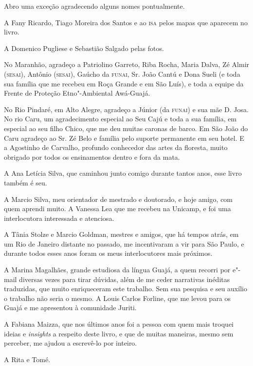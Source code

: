 Abro uma exceção agradecendo alguns nomes pontualmente.

A Fany Ricardo, Tiago Moreira dos Santos e ao \textsc{isa} pelos mapas que
aparecem no livro.

A Domenico Pugliese e Sebastião Salgado pelas fotos.

No Maranhão, agradeço a Patriolino Garreto, Riba Rocha, Maria Dalva, Zé
Almir (\textsc{sesai}), Antônio (\textsc{sesai}), Gaúcho da \textsc{funai}, Sr. João Cantú e Dona
Sueli (e toda sua família que me recebeu em Roça Grande e em São Luís),
e toda a equipe da Frente de Proteção Etno"-Ambiental Awá-Guajá.

No Rio Pindaré, em Alto Alegre, agradeço a Júnior (da \textsc{funai}) e sua mãe
D. Josa. No rio Caru, um agradecimento especial ao Seu Cajú e toda a sua
família, em especial ao seu filho Chico, que me deu muitas caronas de
barco. Em São João do Caru agradeço ao Sr. Zé Belo e família pelo
suporte permanente em seu hotel. E a Agostinho de Carvalho, profundo
conhecedor das artes da floresta, muito obrigado por todos os
ensinamentos dentro e fora da mata.

A Ana Letícia Silva, que caminhou junto comigo durante tantos anos, esse
livro também é seu.

A Marcio Silva, meu orientador de mestrado e doutorado, e hoje amigo,
com quem aprendi muito. A Vanessa Lea que me recebeu na Unicamp, e foi
uma interlocutora interessada e atenciosa.

A Tânia Stolze e Marcio Goldman, mestres e amigos, que há tempos atrás,
em um Rio de Janeiro distante no passado, me incentivaram a vir para São
Paulo, e durante todos esses anos foram os meus interlocutores mais
próximos.

A Marina Magalhães, grande estudiosa da língua Guajá, a quem recorri por
e"-mail diversas vezes para tirar dúvidas, além de me ceder narrativas
inéditas traduzidas, que muito enriqueceram este trabalho. Sem sua
pesquisa e seu auxílio o trabalho não seria o mesmo. A Louis Carlos
Forline, que me levou para os Guajá e me apresentou à comunidade Juriti.

A Fabiana Maizza, que nos últimos anos foi a pessoa com quem mais
troquei ideias e \emph{insights} a respeito deste livro, e que de muitas
maneiras, mesmo sem perceber, me ajudou a escrevê-lo por inteiro.

A Rita e Tomé.

